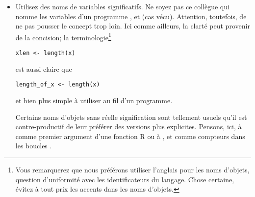 \begin{itemize}
\item Utilisez des noms de variables significatifs. Ne soyez pas ce
  collègue qui nomme les variables d'un programme , 
  et  (cas vécu). Attention, toutefois, de ne pas pousser le
  concept trop loin. Ici comme ailleurs, la clarté peut provenir de la
  concision; la terminologie\footnote{%
    Vous remarquerez que nous préférons utiliser l'anglais pour les
    noms d'objets, question d'uniformité avec les identificateurs du
    langage. Chose certaine, évitez à tout prix les accents dans les
    noms d'objets.}
  \begin{Schunk}
\begin{Verbatim}
xlen <- length(x)
\end{Verbatim}
  \end{Schunk}
  est aussi claire que
  \begin{Schunk}
\begin{Verbatim}
length_of_x <- length(x)
\end{Verbatim}
  \end{Schunk}
  et bien plus simple à utiliser au fil d'un programme.

  Certains noms d'objets sans réelle signification sont tellement
  usuels qu'il est contre-productif de leur préférer des versions plus
  explicites. Pensons, ici, à  comme premier argument d'une
  fonction R ou à ,  et  comme compteurs dans
  les boucles .


\end{itemize}
